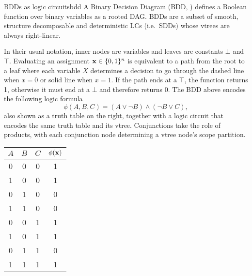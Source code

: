 \begin{example}[sidebyside,lefthand width=0.55\textwidth]{BDDs as logic circuits}{bdd}
  A Binary Decision Diagram (BDD, \cite{bryant86}) defines a Boolean function over binary variables
  as a rooted DAG. BDDs are a subset of smooth, structure decomposable and deterministic LCs (i.e.\
  SDDs) whose vtrees are always right-linear.
  \begin{center}
  \end{center}
  In their usual notation, inner nodes are variables and leaves are constants $\bot$ and $\top$.
  Evaluating an assignment $\mathbf{x}\in\{0,1\}^n$ is equivalent to a path from the root to a
  leaf where each variable $X$ determines a decision to go through the dashed line when $x=0$ or
  solid line when $x=1$. If the path ends at a $\top$, the function returns 1, otherwise it must
  end at a $\bot$ and therefore returns 0. The BDD above encodes the following logic formula
  \begin{equation}
    \phi(A,B,C)=(A\vee\neg B)\wedge(\neg B\vee C),
  \end{equation}
  also shown as a truth table on the right, together with a logic circuit that encodes the same
  truth table and its vtree. Conjunctions take the role of products, with each conjunction node
  determining a vtree node's scope partition.
  \tcblower
  \small%
  \begin{center}
    \begin{tabular}{ccc|c}
      \hline
      $A$ & $B$ & $C$ & $\phi(\mathbf{x})$\\
      \hline
      0 & 0 & 0 & 1\\
      1 & 0 & 0 & 1\\
      0 & 1 & 0 & 0\\
      1 & 1 & 0 & 0\\
      0 & 0 & 1 & 1\\
      1 & 0 & 1 & 1\\
      0 & 1 & 1 & 0\\
      1 & 1 & 1 & 1\\
      \hline
    \end{tabular}


\end{center}
\end{example}
